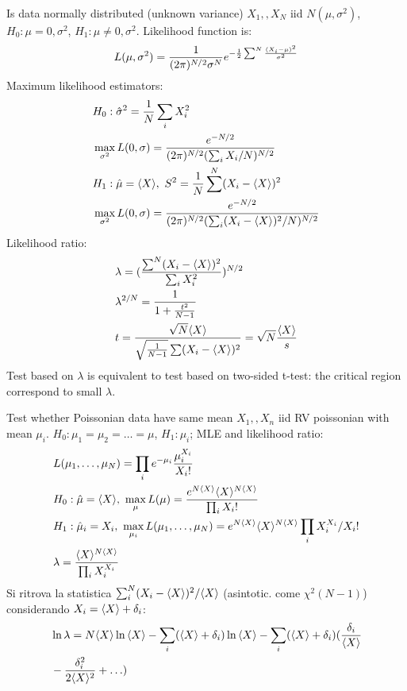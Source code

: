 \begin{wordonframe}{Is data normally distributed (unknown variance)}
$X_1,,X_N$ iid $N(\mu,\sigma^2)$, $H_0: \mu=0,\sigma^2$, $H_1: \mu\neq0,\sigma^2$. Likelihood function is: 
\begin{equation*}
L(\mu,\sigma^2)=\frac{1}{(2\pi)^{N/2}\sigma^N}e^{-\frac{1}{2}\sum^N\frac{(X_i-\mu)^2}{\sigma^2}}
\end{equation*}
Maximum likelihood estimators:
\begin{align*}
&H_0: \hat{\sigma}^2=\frac{1}{N}\sum_iX_i^2\\
&\max_{\sigma^2}L(0,\sigma)=\frac{e^{-N/2}}{(2\pi)^{N/2}(\sum_iX_i/N)^{N/2}}\\
&H_1: \hat{\mu}=\langle X \rangle,\ S^2=\frac{1}{N}\sum^N(X_i-\langle X \rangle)^2\\
&\max_{\sigma^2}L(0,\sigma)=\frac{e^{-N/2}}{(2\pi)^{N/2}(\sum_i(X_i-\langle X \rangle)^2/N)^{N/2}}\\
\end{align*}
Likelihood ratio:
\begin{align*}
&\lambda=(\frac{\sum^N(X_i-\langle X \rangle)^2}{\sum_iX_i^2})^{N/2}\\
&\lambda^{2/N}=\frac{1}{1+\frac{t^2}{N-1}}\\
&t=\frac{\sqrt{N}\langle X \rangle}{\sqrt{\frac{1}{N-1}}\sum(X_i-\langle X \rangle)^2}=\sqrt{N}\frac{\langle X \rangle}{s}
\end{align*}
Test based on $\lambda$ is equivalent to test based on two-sided t-test: the critical region correspond to small $\lambda$.
\end{wordonframe}

\begin{wordonframe}{Test whether Poissonian data have same mean}
$X_1,,X_n$ iid RV poissonian with mean $\mu_i$. $H_0: \mu_1=\mu_2=\ldots=\mu$, $H_1: \mu_i$; MLE and likelihood ratio:
\begin{align*}
&L(\mu_1,\ldots,\mu_N)=\prod_i\exp{-\mu_i}\frac{\mu_i^{X_i}}{X_i!}\\
&H_0: \hat{\mu}=\exv{X},\ \max_{\mu}L(\mu)=\frac{\exp{N\exv{X}}\exv{X}\expy{N\exv{X}}}{\prod_iX_i!}\\
&H_1: \hat{\mu}_i=X_i,\ \max_{\mu_i}L(\mu_1,\ldots,\mu_N)=\exp{N\exv{X}}\exv{X}\expy{N\exv{X}}\prod_iX_i\expy{X_i}/X_i!\\
&\lambda=\frac{\exv{X}\expy{N\exv{X}}}{\prod_iX_i\expy{X_i}}
\end{align*}
Si ritrova la statistica $\sum_i^N(X_i-\langle X \rangle)^2/\langle X \rangle$ (asintotic. come $\chi^2(N-1)$) considerando $X_i=\langle X \rangle+\delta_i$:
\begin{align*}
&\ln{\lambda}=N\langle X \rangle\ln{\langle X \rangle}-\sum_i(\langle X \rangle+\delta_i)\ln{\langle X \rangle}-\sum_i(\langle X \rangle+\delta_i)(\frac{\delta_i}{\langle X \rangle}\\
&-\frac{\delta_i^2}{2\langle X \rangle^2}+\ldots)
\end{align*}
\end{wordonframe}

